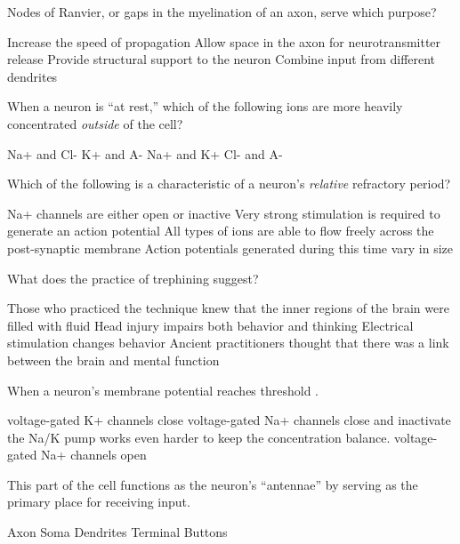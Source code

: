 \documentclass[answers]{exam}
\begin{document}
\begin{questions}
\question Nodes of Ranvier, or gaps in the myelination of an axon, serve which purpose? 
\begin{choices}
\correctchoice Increase the speed of propagation
\choice Allow space in the axon for neurotransmitter release
\choice Provide structural support to the neuron 
\choice Combine input from different dendrites 
\end{choices}

\question When a neuron is “at rest,” which of the following ions are more heavily concentrated \emph{outside} of the cell?
\begin{choices}
\correctchoice Na+ and Cl-
\choice K+ and A-
\choice Na+ and K+
\choice Cl- and A-  
\end{choices}

\question Which of the following is a characteristic of a neuron’s \emph{relative} refractory period?
\begin{choices}
\choice Na+ channels are either open or inactive
\correctchoice Very strong stimulation is required to generate an action potential 
\choice All types of ions are able to flow freely across the post-synaptic membrane 
\choice Action potentials generated during this time vary in size 
\end{choices}

\question What does the practice of trephining suggest? 
\begin{choices}
\choice Those who practiced the technique knew that the inner regions of the brain were filled with fluid
\choice Head injury impairs both behavior and thinking 
\choice Electrical stimulation changes behavior
\correctchoice Ancient practitioners thought that there was a link between the brain and mental function
\end{choices}

\question When a neuron's membrane potential reaches threshold \fillin.
\begin{choices}
\choice voltage-gated K+ channels close 
\choice voltage-gated Na+ channels close and inactivate
\choice the Na/K pump works even harder to keep the concentration balance.
\correctchoice voltage-gated Na+ channels open
\end{choices}

\newpage

\question This part of the cell functions as the neuron’s “antennae” by serving as the primary place for receiving input.
\begin{choices}
\choice Axon
\choice Soma
\correctchoice Dendrites
\choice Terminal Buttons
\end{choices}


\end{questions}
\end{document}
